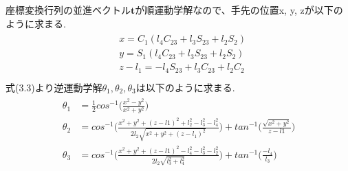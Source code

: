 	座標変換行列の並進ベクトル$\boldsymbol{t}$が順運動学解なので、手先の位置x, y, zが以下のように求まる.
	\begin{equation}
			\begin{array}{c}
			\begin{split}
				& x = C_1(l_4C_{23} + l_3S_{23} + l_2S_2) \\
				& y = S_1(l_4C_{23} + l_3S_{23} + l_2S_2) \\
				& z - l_1 = -l_4S_{23} + l_3C_{23} + l_2C_2 \\
			\end{split}
		\end{array}
	\end{equation}
	式(3.3)より逆運動学解$\theta_1, \theta_2, \theta_3$は以下のように求まる.
	\begin{equation}
			\begin{array}{c}
			\begin{split}
				\theta_1  &  =\frac{1}{2}  cos^{-1}\biggl( \frac{x^2-y^2}{x^2+y^2} \biggr) \\
				\theta_2 & = cos^{-1}\biggl( \frac{x^2+y^2+(z-l1)^2 + l_2^2-l_3^2-l_4^2}{2l_2\sqrt{x^2+y^2+(z-l_1)^2}} \biggr) + tan^{-1}\biggl( \frac{\sqrt{x^2+y^2}}{z-l1}\biggr) \\
				\theta_3 & =cos^{-1}\biggl( \frac{x^2+y^2+(z-l1)^2 - l_4^2-l_3^2-l_2^2}{2l_2\sqrt{l_3^2+l_4^2}}\biggr) + tan^{-1}\biggl( \frac{-l_4}{l_3}\biggr)
			\end{split}
			\end{array}
	\end{equation}

